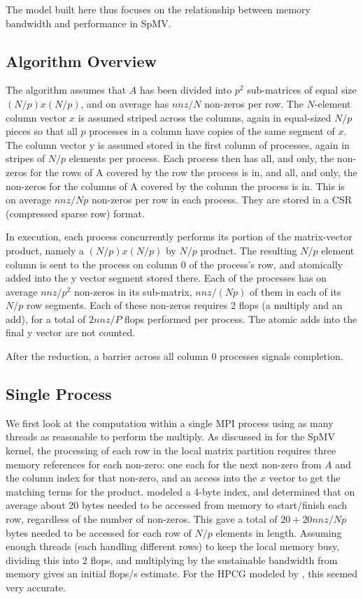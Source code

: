 The model built here thus focuses on the relationship between memory bandwidth and performance in SpMV.

\subsection{Algorithm Overview}

The algorithm assumes that $A$ has been divided into $p^2$ sub-matrices of equal size $(N/p)x(N/p)$, and on average has $nnz/N$ non-zeros per row. The $N$-element column vector $x$ is assumed striped across the columns, again in equal-sized $N/p$ pieces so that all $p$ processes in a column have copies of the same segment of $x$. The column vector y is assumed stored in the first column of processes, again in stripes of $N/p$ elements per process. Each process then has all, and only, the non-zeros for the rows of A covered by the row the process is in, and all, and only, the non-zeros for the columns of A covered by the column the process is in. This is on average $nnz/Np$ non-zeros per row in each process. They are stored in a CSR (compressed sparse row) format.

In execution, each process concurrently performs its portion of the matrix-vector product, namely a $(N/p)x(N/p)$ by $N/p$ product. The resulting $N/p$ element column is sent to the process on column 0 of the process's row, and atomically added into the y vector segment stored there. Each of the processes has on average $nnz/p^2$ non-zeros in its sub-matrix, $nnz/(Np)$ of them in each of its $N/p$ row segments. Each of these non-zeros requires 2 flops (a multiply and an add), for a total of $2nnz/P$ flops performed per process. The atomic adds into the final y vector are not counted.

After the reduction, a barrier across all column 0 processes signals completion.

\subsection{Single Process}\label{sec:spmv-analytic:single}

We first look at the computation within a single MPI process using as many threads as reasonable to perform the multiply. As discussed in \cite{techbib:marjanovic2014performance} for the SpMV kernel, the processing of each row in the local matrix partition requires three memory references for each non-zero: one each for the next non-zero from $A$ and the column index for that non-zero, and an access into the $x$ vector to get the matching terms for the product. \cite{techbib:marjanovic2014performance} modeled a 4-byte index, and determined that on average about 20 bytes needed to be accessed from memory to start/finish each row, regardless of the number of non-zeros. This gave a total of $20+20nnz/Np$ bytes needed to be accessed for each row of $N/p$ elements in length. Assuming enough threads (each handling different rows) to keep the local memory busy, dividing this into 2 flops, and multiplying by the sustainable bandwidth from memory gives an initial flops/s estimate. For the HPCG modeled by \cite{techbib:marjanovic2014performance}, this seemed very accurate.

